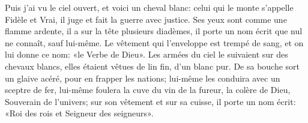 Puis j’ai vu le ciel ouvert, et voici un cheval blanc:
	celui qui le monte s’appelle Fidèle et Vrai,
	il juge et fait la guerre avec justice.
Ses yeux sont comme une flamme ardente, il a sur la tête plusieurs diadèmes,
	il porte un nom écrit que nul ne connaît, sauf lui-même.
Le vêtement qui l’enveloppe est trempé de sang,
	et on lui donne ce nom: «le Verbe de Dieu».
Les armées du ciel le suivaient sur des chevaux blancs,
	elles étaient vêtues de lin fin, d’un blanc pur.
De sa bouche sort un glaive acéré, pour en frapper les nations;
	lui-même les conduira avec un sceptre de fer,
	lui-même foulera la cuve du vin de la fureur,
	la colère de Dieu, Souverain de l’univers;
	sur son vêtement et sur sa cuisse, il porte un nom écrit:
	«Roi des rois et Seigneur des seigneurs».
